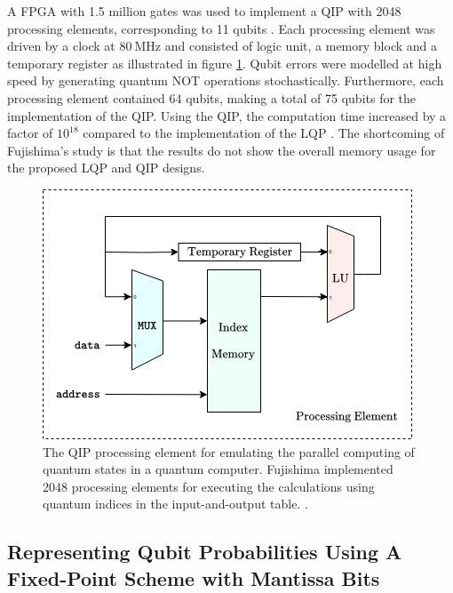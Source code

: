 A FPGA with 1.5 million gates was used to implement a QIP with 2048 processing elements, corresponding to 11 qubits \cite{fujishima2003fpga}. Each processing element was driven by a clock at $\SI{80}{\mega\hertz}$ and consisted of logic unit, a memory block and a temporary register as illustrated in figure \ref{fig:fujishima-qip-block}. Qubit errors were modelled at high speed by generating quantum NOT operations stochastically. Furthermore, each processing element contained 64 qubits, making a total of 75 qubits for the implementation of the QIP. Using the QIP, the computation time increased by a factor of $10^{18}$ compared to the implementation of the LQP \cite{fujishima2003fpga}. The shortcoming of Fujishima's study is that the results do not show the overall memory usage for the proposed LQP and QIP designs.  

\begin{figure}[!ht]
	\centering
	\includegraphics[width=1.0\linewidth]{body/ch3/figs/fujishima-qip-block}
	\caption[Fujishima's Processing Element for Emulating Qubits.]{The QIP processing element for emulating the parallel computing of quantum states in a quantum computer. Fujishima implemented 2048 processing elements for executing the calculations using quantum indices in the input-and-output table. \cite{fujishima2003fpga}.}
	\label{fig:fujishima-qip-block}
\end{figure}

\subsection{Representing Qubit Probabilities Using A Fixed-Point Scheme with Mantissa Bits}

